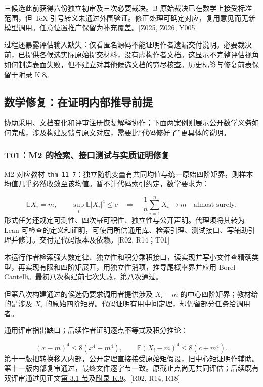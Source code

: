 三候选此前获得六份独立初审及三次必要裁决。B 原始裁决已在数学上接受标准范围，但 TeX 引号转义未通过外围验证。修正处理可确定对应，复用意见而无新模型调用。任意位置推广保留为补充覆盖。[Z025, Z026, Y005]

过程还暴露评估输入缺失：仅看匿名源码不能证明作者遗漏交付说明。必要裁决前，已提供各候选实际原始提交材料，没有虚构作者文档。这显示不完整评估视角如何制造表面失败，但不建立对其他候选文档的穷尽核查。历史标签与修复前表保留于\hyperlink{k8}{附录 K.8}。

\subsection[数学修复：在证明内部推导前提]{\texorpdfstring{\protect\hypertarget{g14}{}数学修复：在证明内部推导前提}{数学修复：在证明内部推导前提}}
协助采用、文档变化和评审注册恢复解释协作；下面两案例则展示公开数学义务如何完成，涉及构建反馈与原文对应，需要比“代码修好了”更具体的说明。

\subsubsection[T01：M2 的检索、接口测试与实质证明修复]{\texorpdfstring{\protect\hypertarget{g14-1}{}T01：M2 的检索、接口测试与实质证明修复}{T01：M2 的检索、接口测试与实质证明修复}}
M2 对应教材 \nolinkurl{thm_11_7}：独立随机变量有共同均值与统一原始四阶矩界，则样本均值几乎必然收敛至该均值。暂不计代码索引约定，数学要求为：

\[
\mathbb{E}X_i=m,\qquad \sup_i\mathbb{E}|X_i|^4\le c
\quad\Longrightarrow\quad
\frac1n\sum_{i=1}^{n}X_i\longrightarrow m\quad\text{almost surely}.
\]
形式任务还规定可测性、四次幂可积性、独立性与公开声明。代理须将其转为 Lean 可检查的定义和证明，可使用所供通用库、检索引理、测试接口、写辅助引理并修订。交付是代码版本及依赖。[R02, R14；T01]

本运行作者检索强大数定律、独立性和积分乘积接口，读实现并写小文件查精确类型，再实现有限和四阶矩展开，用独立性消项，推导尾概率界并应用 Borel-Cantelli。最初八次构建前七次失败，第八次通过。

但第八次构建通过的候选仍要求调用者提供涉及 $X_i-m$ 的中心四阶矩界；教材给的是涉及 $X_i$ 的原始四阶矩界。代码证明有用中间定理，却仍留部分任务给调用者。

通用评审指出缺口；后续作者证明逐点不等式及积分推论：

\[
(x-m)^4\le 8(x^4+m^4),\qquad
\mathbb{E}(X_i-m)^4\le 8(c+m^4).
\]
第十一版把转换移入内部，公开定理直接接受原始矩假设，旧中心矩证明作辅助。第十一版内部复审通过，最终文件逐字节一致。原截止点尚无共同评估；后续既有双评审通过见正文\href{zh.pdf\#section-3-1}{第 3.1 节}及\hyperlink{k9}{附录 K.9}。[R02, R14, R18]

